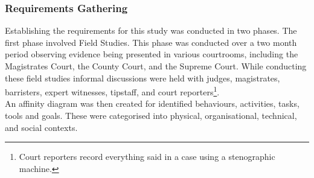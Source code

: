 \documentclass{article}
\begin{document}
\subsubsection{Requirements Gathering}
Establishing the requirements for this study was conducted in two phases. The first phase involved Field Studies. This phase was conducted over a two month period observing evidence being presented in various courtrooms, including the Magistrates Court, the County Court, and the Supreme Court. While conducting these field studies informal discussions were held with judges, magistrates, barristers, expert witnesses, tipstaff, and court reporters\footnote{Court reporters record everything said in a case using a stenographic machine.  }.\\
An affinity diagram was then created for identified behaviours, activities, tasks, tools and goals. These were categorised into physical, organisational, technical, and social contexts.
\end{document}
